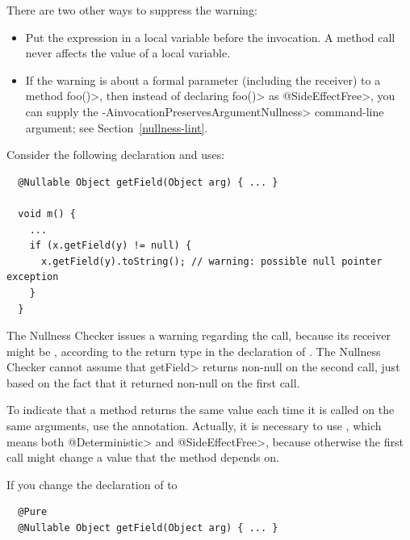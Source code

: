 There are two other ways to suppress the warning:

\begin{itemize}
\item
  Put the expression in a local variable before the invocation.  A method
  call never affects the value of a local variable.
\item
  If the warning is about a formal parameter (including the receiver) to a
  method \<foo()>, then instead of declaring \<foo()> as
  \<@SideEffectFree>, you can supply the
  \<-AinvocationPreservesArgumentNullness> command-line argument; see
  Section~\ref{nullness-lint}.
\end{itemize}



Consider the following declaration and uses:

\begin{Verbatim}
  @Nullable Object getField(Object arg) { ... }

  void m() {
    ...
    if (x.getField(y) != null) {
      x.getField(y).toString(); // warning: possible null pointer exception
    }
  }
\end{Verbatim}

The Nullness Checker issues a warning regarding the
 call, because its receiver  might
be , according to the  return type in the
declaration of .  The Nullness Checker cannot assume that
\<getField> returns non-null on the second call, just based on the fact
that it returned non-null on the first call.

To indicate that a method returns the same value each time it is called on
the same arguments, use the  annotation.
Actually, it is necessary to use , which
means both \<@Deterministic> and \<@SideEffectFree>, because otherwise the
first call might change a value that the method depends on.

If you change the declaration of  to

\begin{Verbatim}
  @Pure
  @Nullable Object getField(Object arg) { ... }
\end{Verbatim}

